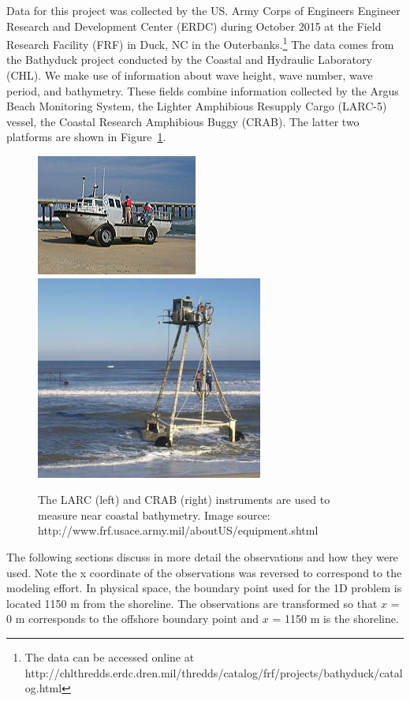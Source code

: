Data for this project was collected by the US. Army Corps of Engineers Engineer Research and Development Center (ERDC) during October 2015 at the Field Research Facility (FRF) in Duck, NC in the Outerbanks.\footnote{The data can be accessed online at http://chlthredds.erdc.dren.mil/thredds/catalog/frf/projects/bathyduck/catalog.html} The data comes from the Bathyduck project conducted by the Coastal and Hydraulic Laboratory (CHL). We make use of information about wave height, wave number, wave period, and bathymetry. These fields combine information collected by the Argus Beach Monitoring System, the Lighter Amphibious Resupply Cargo (LARC-5) vessel, the Coastal Research Amphibious Buggy (CRAB). The latter two platforms are shown in Figure~\ref{crablarc}.

\begin{figure}[h]
\includegraphics[width=.48\linewidth]{img/LARC.jpg}\hfill
\includegraphics[width=.48\linewidth]{img/CRAB2.JPG}
\caption{The LARC (left) and CRAB (right) instruments are used to measure near coastal bathymetry. Image source: http://www.frf.usace.army.mil/aboutUS/equipment.shtml}
\label{crablarc}
\end{figure}

The following sections discuss in more detail the observations and how they were used. Note the x coordinate of the observations was reversed to correspond to the modeling effort. In physical space, the boundary point used for the 1D problem is located 1150 m from the shoreline. The observations are transformed so that $\textit{x}$ = 0 m corresponds to the offshore boundary point and $\textit{x}$ = 1150 m is the shoreline. 


